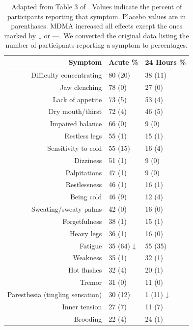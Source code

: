 \documentclass[12pt,letterpaper]{book}
\begin{document}
\begin{table}[htbp]
    \centering
    \caption{Adapted from Table 3 of \textcite{liechtiGender}. Values indicate the percent of participants reporting that symptom. Placebo values are in parenthases. MDMA  increased all effects except the ones marked by ↓ or —. We converted the original data listing the number of participants reporting a symptom to percentages.}
    \label{table:sideeffects}
    \begin{tabular}{|r|l|l|}
    \hline
    \textbf{Symptom} & \textbf{Acute \%} & \textbf{24 Hours \%} \\ \hline
        Difficulty concentrating & 80 (20) & 38 (11)\\
        Jaw clenching            & 78 (0)  & 27 (0)\\
        Lack of appetite         & 73 (5)  & 53 (4)\\
        Dry mouth/thirst         & 72 (4)  & 46 (5)\\
        Impaired balance         & 66 (0)  & 9\phantom{0} (0)\\
        Restless legs            & 55 (1)  & 15 (1)\\
        Sensitivity to cold      & 55 (15) & 16 (4)\\
        Dizziness                & 51 (1)  & 9\phantom{0} (0)\\
        Palpitations             & 47 (1)  & 9\phantom{0} (0)\\
        Restlessness             & 46 (1)  & 16 (1)\\
        Being cold               & 46 (9)  & 12 (4)\\
        Sweating/sweaty palms    & 42 (0)  & 16 (0)\\
        Forgetfulness            & 38 (1)  & 15 (1)\\
        Heavy legs               & 36 (1)  & 16 (0)\\
        Fatigue                  & 35 (64) ↓ & 55 (35)\\
        Weakness                 & 35 (1)  & 32 (1)\\
        Hot flushes              & 32 (4)  & 20 (1)\\
        Tremor                   & 31 (0)  & 11 (0)\\
        Paresthesia (tingling sensation) & 30 (12) & 1 (11) ↓\\
        Inner tension            & 27 (7)  & 11 (7)\\
        Brooding                 & 22 (4)  & 24 (1)\\

\end{tabular}
\end{table}
\end{document}
